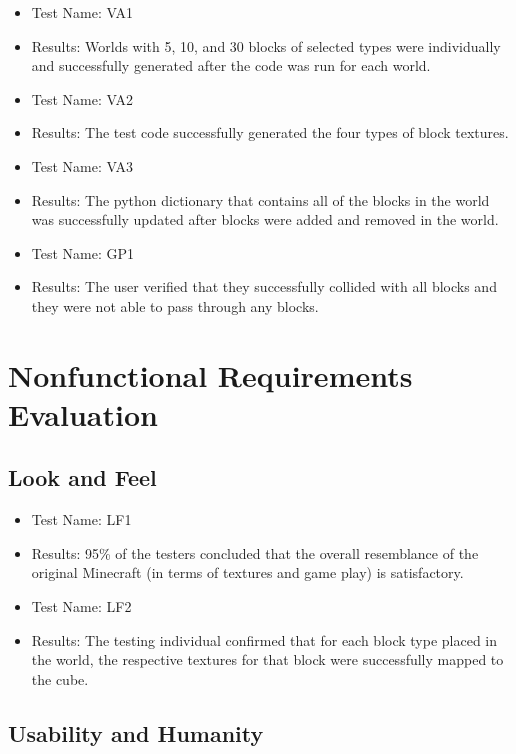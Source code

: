 \documentclass[12pt, titlepage]{article}
\begin{document}
\begin{itemize}
    \item[] Test Name: VA1
    \item[] Results: Worlds with 5, 10, and 30 blocks of selected types were individually and successfully generated after the code was run for each world. \\
    \item[] Test Name: VA2
    \item[] Results: The test code successfully generated the four types of block textures.  \\
    \item[] Test Name: VA3
    \item[] Results: The python dictionary that contains all of the blocks in the world was successfully updated after blocks were added and removed in the world. \\
    \item[] Test Name: GP1
    \item[] Results: The user verified that they successfully collided with all blocks and they were not able to pass through any blocks. \\
    
    
    
    
\end{itemize}

\section{Nonfunctional Requirements Evaluation}

\subsection{Look and Feel}

\begin{itemize}
    \item[] Test Name: LF1
    \item[] Results: 95\% of the testers concluded that the overall resemblance of the original Minecraft (in terms of textures and game play) is satisfactory.
    \item[] Test Name: LF2
    \item[] Results: The testing individual confirmed that for each block type placed in the world, the respective textures for that block were successfully mapped to the cube. 
\end{itemize}

\subsection{Usability and Humanity}
\end{document}
